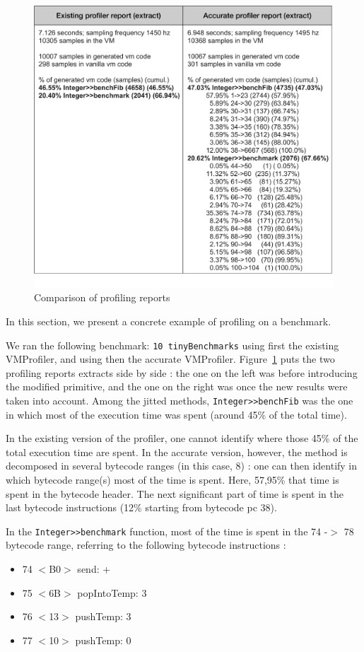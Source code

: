\documentclass[10pt,preprint,nonatbib]{sigplanconf}
\newcommand{\ct}{\lstinline[backgroundcolor=\color{white},basicstyle=\small\ttfamily]}
\newcommand{\figlabel}[1]{\label{fig:#1}}
\newcommand{\figref}[1]{Figure~\ref{fig:#1}}
\begin{document}
  \begin{figure}[!htp]
     \begin{center}
         \includegraphics[width=0.7\linewidth]{ReportComparison}
         \caption{Comparison of profiling reports}
         \figlabel{fig:ReportComparison}
     \end{center}
 \end{figure}

In this section, we present a concrete example of profiling on a benchmark.

We ran the following benchmark: \ct{10 tinyBenchmarks} using first the existing VMProfiler, and using then the accurate VMProfiler. 
\figref{fig:ReportComparison} puts the two  profiling reports extracts side by side : the one on the left was before introducing the modified primitive, and the one on the right was once the new results were taken into account.
Among the jitted methods, \ct{Integer>>benchFib} was the one in which most of the execution time was spent (around 45\% of the total time).

In the existing version of the profiler, one cannot identify where those 45\% of the total execution time are spent. In the accurate version, however, the method is decomposed in several bytecode ranges (in this case, 8) : one can then identify in which bytecode range(s) most of the time is spent. Here, 57,95\% that time is spent in the bytecode header. The next significant part of time is spent in the last bytecode instructions (12\% starting from bytecode pc 38).

In the \ct{Integer>>benchmark} function, most of the time is spent in the 74 -$>$ 78 bytecode range, referring to the following bytecode instructions : 
\begin{itemize}
	\item 74 $<$B0$>$ send: +
	\item 75 $<$6B$>$ popIntoTemp: 3
	\item 76 $<$13$>$ pushTemp: 3
	\item 77 $<$10$>$ pushTemp: 0
\end{itemize}
\end{document}
